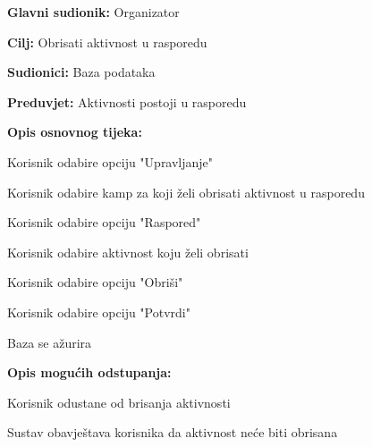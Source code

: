 					\noindent {}
					\begin{packed_item}

						\item \textbf{Glavni sudionik: } Organizator
						\item  \textbf{Cilj:} Obrisati aktivnost u rasporedu
						\item  \textbf{Sudionici:} Baza podataka
						\item  \textbf{Preduvjet:} Aktivnosti postoji u rasporedu	
						\item  \textbf{Opis osnovnog tijeka:}
						
						\item[] \begin{packed_enum}
							
							\item Korisnik odabire opciju "Upravljanje"
							\item Korisnik odabire kamp za koji želi obrisati aktivnost u rasporedu
							\item Korisnik odabire opciju "Raspored"
							\item Korisnik odabire aktivnost koju želi obrisati
							\item Korisnik odabire opciju "Obriši"
							\item Korisnik odabire opciju "Potvrdi"
							\item Baza se ažurira
		
						\end{packed_enum}
						
						\item  \textbf{Opis mogućih odstupanja:}
						
						\item[] \begin{packed_item}
							
							\item[2.a] Korisnik odustane od brisanja aktivnosti
							\item[] \begin{packed_enum}
								
								\item Sustav obavještava korisnika da aktivnost neće biti obrisana

							\end{packed_enum}			
						\end{packed_item}
					\end{packed_item}
				
